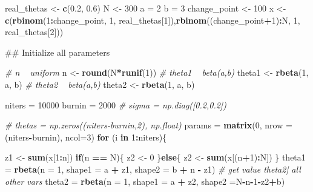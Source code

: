 \documentclass[]{book}
\newenvironment{Shaded}{\begin{snugshade}}{\end{snugshade}}
\newcommand{\KeywordTok}[1]{\textcolor[rgb]{0.13,0.29,0.53}{\textbf{#1}}}
\newcommand{\DataTypeTok}[1]{\textcolor[rgb]{0.13,0.29,0.53}{#1}}
\newcommand{\DecValTok}[1]{\textcolor[rgb]{0.00,0.00,0.81}{#1}}
\newcommand{\FloatTok}[1]{\textcolor[rgb]{0.00,0.00,0.81}{#1}}
\newcommand{\StringTok}[1]{\textcolor[rgb]{0.31,0.60,0.02}{#1}}
\newcommand{\CommentTok}[1]{\textcolor[rgb]{0.56,0.35,0.01}{\textit{#1}}}
\newcommand{\ControlFlowTok}[1]{\textcolor[rgb]{0.13,0.29,0.53}{\textbf{#1}}}
\newcommand{\OperatorTok}[1]{\textcolor[rgb]{0.81,0.36,0.00}{\textbf{#1}}}
\newcommand{\NormalTok}[1]{#1}
\theoremstyle{definition}
\theoremstyle{definition}
\theoremstyle{definition}
\theoremstyle{remark}
\begin{document}
\begin{Shaded}
\begin{Highlighting}[]
\NormalTok{real_thetas <-}\StringTok{ }\KeywordTok{c}\NormalTok{(}\FloatTok{0.2}\NormalTok{, }\FloatTok{0.6}\NormalTok{)}
\NormalTok{N <-}\StringTok{ }\DecValTok{300}
\NormalTok{a =}\StringTok{ }\DecValTok{2}
\NormalTok{b =}\StringTok{ }\DecValTok{3}
\NormalTok{change_point <-}\StringTok{ }\DecValTok{100}
\NormalTok{x <-}\StringTok{ }\KeywordTok{c}\NormalTok{(}\KeywordTok{rbinom}\NormalTok{(}\DecValTok{1}\OperatorTok{:}\NormalTok{change_point, }\DecValTok{1}\NormalTok{, real_thetas[}\DecValTok{1}\NormalTok{]),}\KeywordTok{rbinom}\NormalTok{((change_point}\OperatorTok{+}\DecValTok{1}\NormalTok{)}\OperatorTok{:}\NormalTok{N, }\DecValTok{1}\NormalTok{, real_thetas[}\DecValTok{2}\NormalTok{]))}


\NormalTok{## Initialize all parameters}

\CommentTok{# n ~ uniform }
\NormalTok{n <-}\StringTok{ }\KeywordTok{round}\NormalTok{(N}\OperatorTok{*}\KeywordTok{runif}\NormalTok{(}\DecValTok{1}\NormalTok{))}
\CommentTok{# theta1 ~ beta(a,b)}
\NormalTok{theta1 <-}\StringTok{ }\KeywordTok{rbeta}\NormalTok{(}\DecValTok{1}\NormalTok{, a, b)}
\CommentTok{# theta2 ~ beta(a,b)}
\NormalTok{theta2 <-}\StringTok{ }\KeywordTok{rbeta}\NormalTok{(}\DecValTok{1}\NormalTok{, a, b)}



\NormalTok{niters =}\StringTok{ }\DecValTok{10000}
\NormalTok{burnin =}\StringTok{ }\DecValTok{2000}
\CommentTok{# sigma = np.diag([0.2,0.2])}

\CommentTok{# thetas = np.zeros((niters-burnin,2), np.float)}
\NormalTok{params =}\StringTok{ }\KeywordTok{matrix}\NormalTok{(}\DecValTok{0}\NormalTok{, }\DataTypeTok{nrow =}\NormalTok{ (niters}\OperatorTok{-}\NormalTok{burnin), }\DataTypeTok{ncol=}\DecValTok{3}\NormalTok{)}
\ControlFlowTok{for}\NormalTok{ (i }\ControlFlowTok{in} \DecValTok{1}\OperatorTok{:}\NormalTok{niters)\{}
  
  
\NormalTok{  z1 <-}\StringTok{ }\KeywordTok{sum}\NormalTok{(x[}\DecValTok{1}\OperatorTok{:}\NormalTok{n])}
  \ControlFlowTok{if}\NormalTok{(n }\OperatorTok{==}\StringTok{ }\NormalTok{N)\{}
\NormalTok{    z2 <-}\StringTok{ }\DecValTok{0}
\NormalTok{  \}}\ControlFlowTok{else}\NormalTok{\{}
\NormalTok{    z2 <-}\StringTok{ }\KeywordTok{sum}\NormalTok{(x[(n}\OperatorTok{+}\DecValTok{1}\NormalTok{)}\OperatorTok{:}\NormalTok{N])}
\NormalTok{  \}}
\NormalTok{  theta1 =}\StringTok{ }\KeywordTok{rbeta}\NormalTok{(}\DataTypeTok{n =} \DecValTok{1}\NormalTok{, }\DataTypeTok{shape1 =}\NormalTok{ a }\OperatorTok{+}\StringTok{ }\NormalTok{z1, }\DataTypeTok{shape2 =}\NormalTok{ b }\OperatorTok{+}\StringTok{ }\NormalTok{n }\OperatorTok{-}\StringTok{ }\NormalTok{z1)}
  \CommentTok{# get value theta2| all other vars}
\NormalTok{  theta2 =}\StringTok{ }\KeywordTok{rbeta}\NormalTok{(}\DataTypeTok{n =} \DecValTok{1}\NormalTok{, }\DataTypeTok{shape1 =}\NormalTok{ a }\OperatorTok{+}\StringTok{ }\NormalTok{z2, }\DataTypeTok{shape2 =}\NormalTok{N}\OperatorTok{-}\NormalTok{n}\OperatorTok{-}\DecValTok{1}\OperatorTok{-}\NormalTok{z2}\OperatorTok{+}\NormalTok{b)}
  

\end{Highlighting}
\end{Shaded}
\end{document}
